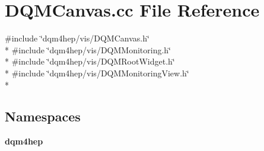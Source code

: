 \section{D\+Q\+M\+Canvas.\+cc File Reference}
\label{DQMCanvas_8cc}
{\ttfamily \#include \char`\"{}dqm4hep/vis/\+D\+Q\+M\+Canvas.\+h\char`\"{}}\\*
{\ttfamily \#include \char`\"{}dqm4hep/vis/\+D\+Q\+M\+Monitoring.\+h\char`\"{}}\\*
{\ttfamily \#include \char`\"{}dqm4hep/vis/\+D\+Q\+M\+Root\+Widget.\+h\char`\"{}}\\*
{\ttfamily \#include \char`\"{}dqm4hep/vis/\+D\+Q\+M\+Monitoring\+View.\+h\char`\"{}}\\*
\subsection*{Namespaces}
\begin{DoxyCompactItemize}
\item 
 {\bf dqm4hep}
\end{DoxyCompactItemize}
